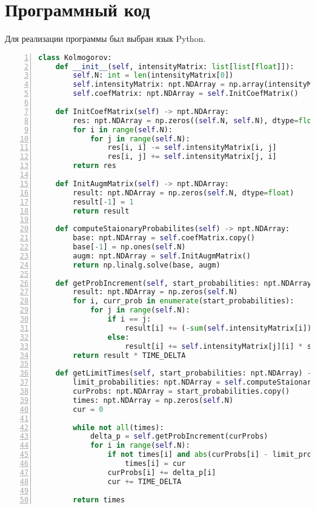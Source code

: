 \chapter{Программный код}

Для реализации программы был выбран язык Python. %

\begin{lstlisting}[language=Python,
                   frame= tb,
                   numbers=left,
                   numberstyle=\footnotesize,
                   caption={Класс для уравнений Колмогорова},
                   label={lst:dst}]
class Kolmogorov:
    def __init__(self, intensityMatrix: list[list[float]]):
        self.N: int = len(intensityMatrix[0])
        self.intensityMatrix: npt.NDArray = np.array(intensityMatrix, dtype=float)
        self.coefMatrix: npt.NDArray = self.InitCoefMatrix()

    def InitCoefMatrix(self) -> npt.NDArray:
        res: npt.NDArray = np.zeros((self.N, self.N), dtype=float)
        for i in range(self.N):
            for j in range(self.N):
                res[i, i] -= self.intensityMatrix[i, j]
                res[i, j] += self.intensityMatrix[j, i]
        return res

    def InitAugmMatrix(self) -> npt.NDArray:
        result: npt.NDArray = np.zeros(self.N, dtype=float)
        result[-1] = 1
        return result

    def computeStaionaryProbabilites(self) -> npt.NDArray:
        base: npt.NDArray = self.coefMatrix.copy()
        base[-1] = np.ones(self.N)
        augm: npt.NDArray = self.InitAugmMatrix()
        return np.linalg.solve(base, augm)

    def getProbIncrement(self, start_probabilities: npt.NDArray) -> npt.NDArray:
        result: npt.NDArray = np.zeros(self.N)
        for i, curr_prob in enumerate(start_probabilities):
            for j in range(self.N):
                if i == j:
                    result[i] += (-sum(self.intensityMatrix[i]) + self.intensityMatrix[i][j]) * curr_prob
                else:
                    result[i] += self.intensityMatrix[j][i] * start_probabilities[j]
        return result * TIME_DELTA

    def getLimitTimes(self, start_probabilities: npt.NDArray) -> npt.NDArray:
        limit_probabilities: npt.NDArray = self.computeStaionaryProbabilites()
        curProbs: npt.NDArray = start_probabilities.copy()
        times: npt.NDArray = np.zeros(self.N)
        cur = 0
        
        while not all(times):
            delta_p = self.getProbIncrement(curProbs)
            for i in range(self.N):
                if not times[i] and abs(curProbs[i] - limit_probabilities[i]) <= EPS:
                    times[i] = cur
                curProbs[i] += delta_p[i]
                cur += TIME_DELTA

        return times

\end{lstlisting}

